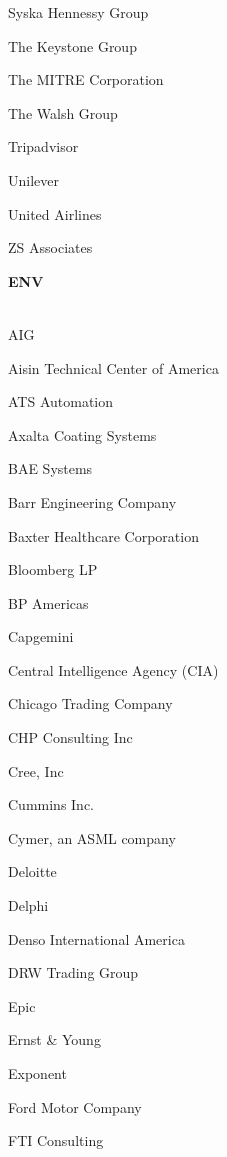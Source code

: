 \documentclass[twoside]{article}
\begin{document}
\begin{center}
\begin{multicols}{5}
\begin{FlushLeft}
\begin{compactitem}
\item Syska Hennessy Group
\item The Keystone Group
\item The MITRE Corporation
\item The Walsh Group
\item Tripadvisor
\item Unilever
\item United Airlines
\item ZS Associates
\end{compactitem}
        \end{FlushLeft}
        \vspace{1em}
        {\fontsize{14}{16}\selectfont \bf ENV}\\
        \vspace{-1em}
        ~\hrulefill~
        \vspace{-.9em}
        \begin{FlushLeft}
        \begin{compactitem}
        \item AIG
\item Aisin Technical Center of America
\item ATS Automation
\item Axalta Coating Systems
\item BAE Systems
\item Barr Engineering Company
\item Baxter Healthcare Corporation
\item Bloomberg LP
\item BP Americas
\item Capgemini
\item Central Intelligence Agency (CIA)
\item Chicago Trading Company
\item CHP Consulting Inc
\item Cree, Inc
\item Cummins Inc.
\item Cymer, an ASML company
\item Deloitte
\item Delphi
\item Denso International America
\item DRW Trading Group
\item Epic
\item Ernst \& Young
\item Exponent
\item Ford Motor Company
\item FTI Consulting

\end{compactitem}
\end{FlushLeft}
\end{multicols}
\end{center}
\end{document}
